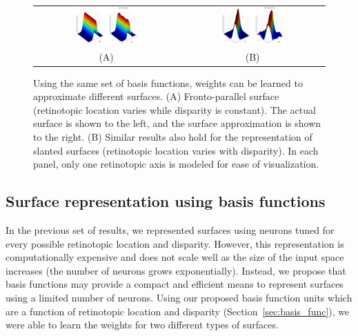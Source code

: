 \begin{figure}[t]
\centering
\begin{tabular}{c c}
\includegraphics[width=0.45\textwidth]{3D-Surface/figs/frontoparallel} &
\includegraphics[width=0.45\textwidth]{3D-Surface/figs/slanted}\\
(A) & (B)
\end{tabular}
\makeatletter
\let\@currsize\normalsize
\caption[Basis functions can approximate different surfaces]{Using the same set of basis functions, weights can be learned to approximate different surfaces. (A) Fronto-parallel surface (retinotopic location varies while disparity is constant). The actual surface is shown to the left, and the surface approximation is shown to the right. (B) Similar results also hold for the representation of slanted surfaces (retinotopic location varies with disparity). In each panel, only one retinotopic axis is modeled for ease of visualization.}
\label{Surface_basisfunc}
\end{figure}


\subsection{Surface representation using basis functions}

In the previous set of results, we represented surfaces using neurons tuned for every possible retinotopic location and disparity. However, this representation is computationally expensive and does not scale well as the size of the input space increases (\ie the number of neurons grows exponentially). Instead, we propose that basis functions may provide a compact and efficient means to represent surfaces using a limited number of neurons. Using our proposed basis function units which are a function of retinotopic location and disparity (Section~\ref{sec:basis_func}), we were able to learn the weights for two different types of surfaces. 

